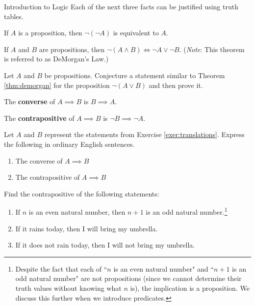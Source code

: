 \begin{section}{Introduction to Logic}
Each of the next three facts can be justified using truth tables.

\begin{theorem}
If $A$ is a proposition, then $\neg(\neg A)$ is equivalent to $A$.
\end{theorem}

\begin{theorem}\label{thm:demorgan}
If $A$ and $B$ are propositions, then $\neg(A \wedge B) \iff \neg A \vee \neg B$.  (\emph{Note}: This theorem is referred to as DeMorgan's Law.)
\end{theorem}

\begin{problem}
Let $A$ and $B$ be propositions.  Conjecture a statement similar to Theorem \ref{thm:demorgan} for the proposition $\neg(A\vee B)$ and then prove it.
\end{problem}

\begin{definition}
The \textbf{converse} of $A \implies B$ is $B \implies A$.
\end{definition}

\begin{definition}
The \textbf{contrapositive} of $A \implies B$ is $\neg B \implies \neg A$.
\end{definition}

\begin{exercise}
Let $A$ and $B$ represent the statements from Exercise \ref{exer:translations}.  Express the following in ordinary English sentences.
\begin{enumerate}
\item The converse of $A \implies B$
\item The contrapositive of $A \implies B$
\end{enumerate}
\end{exercise}

\begin{exercise} Find the contrapositive of the following statements: 
\begin{enumerate}
\item If $n$ is an even natural number, then $n+1$ is an odd natural number.\footnote{Despite the fact that each of ``$n$ is an even natural number" and ``$n+1$ is an odd natural number" are not propositions (since we cannot determine their truth values without knowing what $n$ is), the implication is a proposition.  We discuss this further when we introduce predicates.}
\item If it rains today, then I will bring my umbrella.
\item If it does not rain today, then I will not bring my umbrella.
\end{enumerate} \end{exercise}


\end{section}
